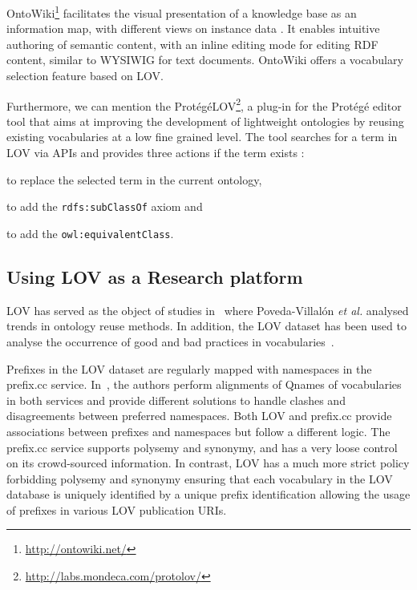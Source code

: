 \documentclass{iosart2c}
\begin{document}
OntoWiki\footnote{\url{http://ontowiki.net/}} facilitates the visual presentation of a knowledge base as an information map, with different views on instance data \cite{auer2006ontowiki}. It enables intuitive authoring of semantic content, with an inline editing mode for editing RDF content, similar to WYSIWIG for text documents. OntoWiki offers a vocabulary selection feature based on LOV.

Furthermore, we can mention the Prot{\'e}g{\'e}LOV\footnote{\url{http://labs.mondeca.com/protolov/}}, a plug-in for the Prot{\'e}g{\'e} editor tool \cite{prolov2015} that aims at improving the development of lightweight ontologies by reusing existing vocabularies at a low fine grained level. The tool searches for a term in LOV via APIs and provides three actions if the term exists : 
\begin{inparaenum}[1)] 
 \item to replace the selected term in the current ontology, 
 \item to add the {\small\texttt{rdfs:subClassOf}} axiom and 
 \item to add the {\small\texttt{owl:equivalentClass}}.
\end{inparaenum}



\subsection{Using LOV as a Research platform}

LOV has served as the object of studies in~\cite{poveda2012landscape} where Poveda-Villal\'on \emph{et al.} analysed trends in ontology reuse methods. In addition, the LOV dataset has been used to analyse the occurrence of good and bad practices in vocabularies~\cite{poveda2013detecting}.

Prefixes in the LOV dataset are regularly mapped with namespaces in the prefix.cc service. In~\cite{wasabi13}, the authors perform alignments of Qnames of vocabularies in both services and provide different solutions to handle clashes and disagreements between preferred namespaces. Both LOV and prefix.cc provide associations between prefixes and namespaces but follow a different logic. The prefix.cc service supports polysemy and synonymy, and has a very loose control on its crowd-sourced information. In contrast, LOV has a much more strict policy forbidding polysemy and synonymy ensuring that each vocabulary in the LOV database is uniquely identified by a unique prefix identification allowing the usage of prefixes in various LOV publication URIs. 
\end{document}
